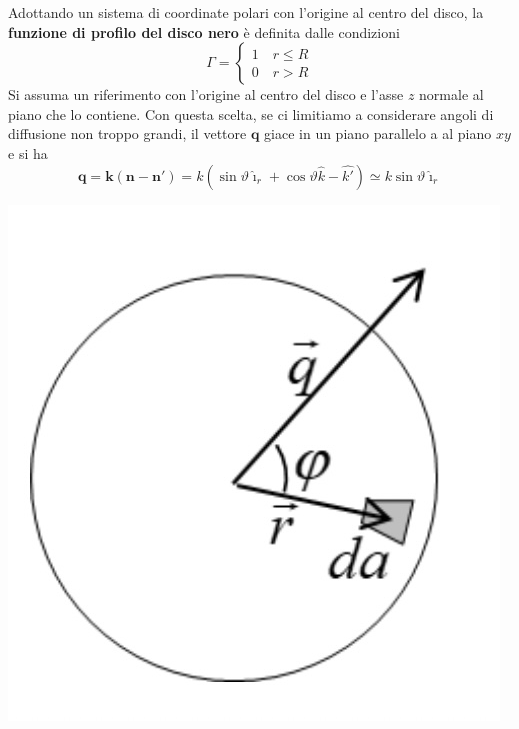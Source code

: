 Adottando un sistema di coordinate polari con l'origine al centro del
disco, la \textbf{funzione di profilo del disco nero} è definita dalle
condizioni
\[
	\Gamma  =
	\begin{cases}
		1  \quad r \leq R \\
		0  \quad r > R
	\end{cases}
\]
Si assuma un riferimento con l'origine al centro del disco e l'asse $z$ normale al piano che lo contiene.
Con questa scelta, se ci limitiamo a considerare angoli di diffusione non troppo grandi, il vettore $\bm{q}$ giace in un piano parallelo a al piano $xy$ e si ha \[
	\bm{q} = \bm{k} ( \bm{n} - \bm{n}') = k ( \sin \vartheta \hat{\imath}_r + \cos \vartheta \hat{k} - \hat{k'}) \simeq
	k \sin \vartheta \hat{\imath}_r
\]

\begin{marginfigure}
	\centering
	\includegraphics{figs/schema-vett-trasferito-2}
	\label{fig:vett-trasferito2}
\end{marginfigure}

